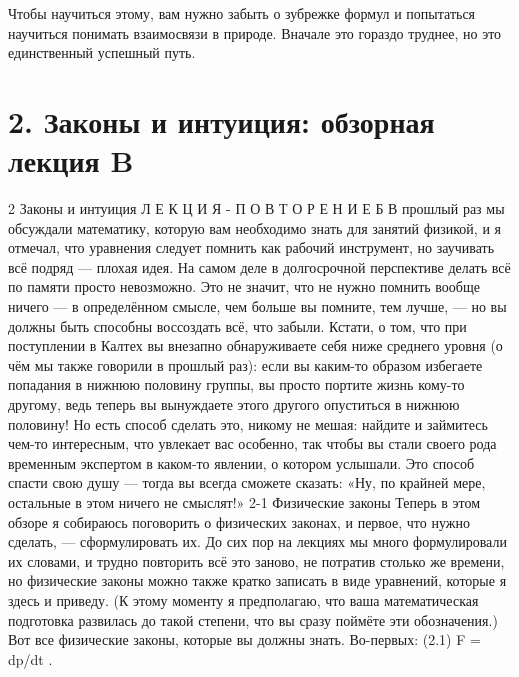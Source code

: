 \documentclass[10pt,oneside]{article}
\begin{document}
Чтобы научиться этому, вам нужно забыть о зубрежке формул и попытаться научиться понимать взаимосвязи в природе. Вначале это гораздо труднее, но это единственный успешный путь.\par

\clearpage
{}
\section*{2. Законы и интуиция: обзорная лекция B}
\label{tips-sec-10-2-законы-и-интуиция-обзорная-лекция-b}
2 Законы и интуиция Л Е К Ц И Я - П О В Т О Р Е Н И Е   Б В прошлый раз мы обсуждали математику, которую вам необходимо знать для занятий физикой, и я отмечал, что уравнения следует помнить как рабочий инструмент, но заучивать всё подряд --- плохая идея. На самом деле в долгосрочной перспективе делать всё по памяти просто невозможно. Это не значит, что не нужно помнить вообще ничего --- в определённом смысле, чем больше вы помните, тем лучше, --- но вы должны быть способны воссоздать всё, что забыли. Кстати, о том, что при поступлении в Калтех вы внезапно обнаруживаете себя ниже среднего уровня (о чём мы также говорили в прошлый раз): если вы каким-то образом избегаете попадания в нижнюю половину группы, вы просто портите жизнь кому-то другому, ведь теперь вы вынуждаете этого другого опуститься в нижнюю половину! Но есть способ сделать это, никому не мешая: найдите и займитесь чем-то интересным, что увлекает вас особенно, так чтобы вы стали своего рода временным экспертом в каком-то явлении, о котором услышали. Это способ спасти свою душу --- тогда вы всегда сможете сказать: «Ну, по крайней мере, остальные в этом ничего не смыслят!» 2-1 Физические законы Теперь в этом обзоре я собираюсь поговорить о физических законах, и первое, что нужно сделать, --- сформулировать их. До сих пор на лекциях мы много формулировали их словами, и трудно повторить всё это заново, не потратив столько же времени, но физические законы можно также кратко записать в виде уравнений, которые я здесь и приведу. (К этому моменту я предполагаю, что ваша математическая подготовка развилась до такой степени, что вы сразу поймёте эти обозначения.) Вот все физические законы, которые вы должны знать. Во-первых: (2.1) F = dp/dt .\par
\end{document}
